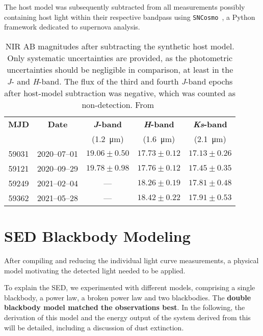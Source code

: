 The host model was subsequently subtracted from all measurements possibly containing host light within their respective bandpass using \texttt{SNCosmo}~, a Python framework dedicated to supernova analysis.

\begin{table}
    \centering
    \begin{tabular}{c c c c  c}
        \hline
        \textbf{MJD} & \textbf{Date} & \textbf{\textit{J}-band} & \textbf{\textit{H}-band} & \textbf{\textit{Ks}-band} \\
                     &               & (\SI{1.2}{\micro\m})     & (\SI{1.6}{\micro\m})     & (\SI{2.1}{\micro\m})      \\
        \hline
        \hline
        59031        & 2020--07--01  & $19.06 \pm 0.50$         & $ 17.73 \pm 0.12$        & $17.13 \pm 0.26$          \\
        59121        & 2020--09--29  & $19.78 \pm 0.98$         & $ 17.76 \pm 0.12$        & $17.45 \pm 0.35$          \\
        59249        & 2021--02--04  & ---                      & $ 18.26 \pm 0.19$        & $17.81 \pm 0.48$          \\
        59362        & 2021--05--28  & ---                      & $ 18.42 \pm 0.22$        & $17.91 \pm 0.53$          \\
        \hline
    \end{tabular}
    \caption[NIR magnitudes]{NIR AB magnitudes after subtracting the synthetic host model. Only systematic uncertainties are provided, as the photometric uncertainties should be negligible in comparison, at least in the \textit{J}- and \textit{H}-band. The flux of the third and fourth \textit{J}-band epochs after host-model subtraction was negative, which was counted as non-detection. From~\cite{Reusch2022}}\label{tab:p200_nir}
\end{table}

\section{SED Blackbody Modeling}
After compiling and reducing the individual light curve measurements, a physical model motivating the detected light needed to be applied.

To explain the SED, we experimented with different models, comprising a single blackbody, a power law, a broken power law and two blackbodies. The \textbf{double blackbody model matched the observations best}. In the following, the derivation of this model and the energy output of the system derived from this will be detailed, including a discussion of dust extinction.

